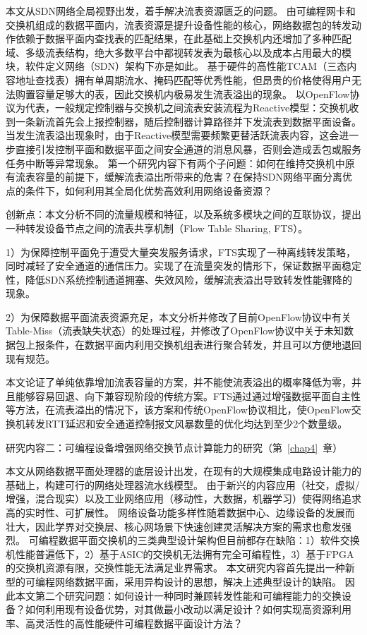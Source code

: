 {\hei 本文从SDN网络全局视野出发，着手解决流表资源匮乏的问题。}
由可编程网卡和交换机组成的数据平面内，流表资源是提升设备性能的核心，网络数据包的转发动作依赖于数据平面内查找表的匹配结果，在此基础上交换机内还增加了多种匹配域、多级流表结构，绝大多数平台中都视转发表为最核心以及成本占用最大的模块，软件定义网络（SDN）架构下亦是如此。
基于硬件的高性能TCAM（三态内容地址查找表）拥有单周期流水、掩码匹配等优秀性能，但昂贵的价格使得用户无法购置容量足够大的表，因此交换机内极易发生流表溢出的现象。
以OpenFlow协议为代表，一般规定控制器与交换机之间流表安装流程为Reactive模型：交换机收到一条新流首先会上报控制器，随后控制器计算路径并下发流表到数据平面设备。
当发生流表溢出现象时，由于Reactive模型需要频繁更替活跃流表内容，这会进一步直接引发控制平面和数据平面之间安全通道的消息风暴，否则会造成丢包或服务任务中断等异常现象。
第一个研究内容下有两个子问题：如何在维持交换机中原有流表容量的前提下，缓解流表溢出所带来的危害？在保持SDN网络平面分离优点的条件下，如何利用其全局化优势高效利用网络设备资源？


{\hei 创新点：}本文分析不同的流量规模和特征，以及系统多模块之间的互联协议，提出一种转发设备节点之间的流表共享机制（Flow Table Sharing, FTS）。

1）为保障控制平面免于遭受大量突发服务请求，FTS实现了一种离线转发策略，同时减轻了安全通道的通信压力。实现了在流量突发的情形下，保证数据平面稳定性，降低SDN系统控制通道拥塞、失效风险，缓解流表溢出导致转发性能骤降的现象。

2）为保障数据平面流表资源充足，本文分析并修改了目前OpenFlow协议中有关Table-Miss（流表缺失状态）的处理过程，并修改了OpenFlow协议中关于未知数据包上报条件，在数据平面内利用交换机组表进行聚合转发，并且可以方便地退回现有规范。

本文论证了单纯依靠增加流表容量的方案，并不能使流表溢出的概率降低为零，并且能够容易回退、向下兼容现阶段的传统方案。FTS通过通过增强数据平面自主性等方法，在流表溢出的情况下，该方案和传统OpenFlow协议相比，使OpenFlow交换机转发RTT延迟和安全通道控制报文风暴数量的优化均达到至少2个数量级。



{\hei 研究内容二：可编程设备增强网络交换节点计算能力的研究（第~\ref{chap4}~章）}

{\hei 本文从网络数据平面处理器的底层设计出发，在现有的大规模集成电路设计能力的基础上，构建可行的网络处理器流水线模型。}
由于新兴的内容应用（社交，虚拟/增强，混合现实）以及工业网络应用（移动性，大数据，机器学习）使得网络追求高的实时性、可扩展性。
网络设备功能多样性随着数据中心、边缘设备的发展而壮大，因此学界对交换层、核心网场景下快速创建灵活解决方案的需求也愈发强烈。
可编程数据平面交换机的三类典型设计架构但目前都存在缺陷：1）软件交换机性能普遍低下，2）基于ASIC的交换机无法拥有完全可编程性，3）基于FPGA的交换机资源有限，交换性能无法满足业界需求。
本文研究内容首先提出一种新型的可编程网络数据平面，采用异构设计的思想，解决上述典型设计的缺陷。
因此本文第二个研究问题：如何设计一种同时兼顾转发性能和可编程能力的交换设备？如何利用现有设备优势，对其做最小改动以满足设计？如何实现高资源利用率、高灵活性的高性能硬件可编程数据平面设计方法？

